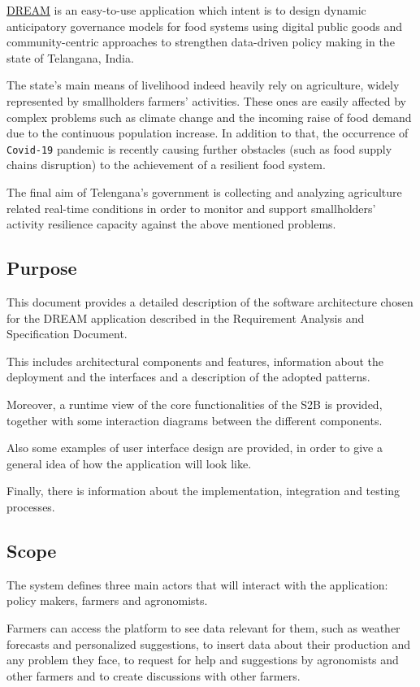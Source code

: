 \hyperref[tab:acronymsTable]{DREAM} is an easy-to-use application which intent is \cite{grw_GitHub} to design dynamic anticipatory governance models for food systems using digital public goods and community-centric approaches to strengthen data-driven policy making in the state of Telangana, India.

The state's main means of livelihood indeed heavily rely on agriculture, widely represented by smallholders farmers' activities. These ones are easily affected by complex problems such as climate change and the incoming raise of food demand due to the continuous population increase. In addition to that, the occurrence of \texttt{Covid-19} pandemic is recently causing further obstacles (such as food supply chains disruption) to the achievement of a resilient food system.

The final aim of Telengana's government is collecting and analyzing agriculture related real-time conditions in order to monitor and support smallholders' activity resilience capacity against the above mentioned problems.

\subsection{Purpose}
\label{sec:purpose}
This document provides a detailed description of the software architecture chosen for the DREAM application described in the Requirement Analysis and Specification Document. 

This includes architectural components and features, information about the deployment and the interfaces and a description of the adopted patterns. 

Moreover, a runtime view of the core functionalities of the S2B is provided, together with some interaction diagrams between the different components. 

Also some examples of user interface design are provided, in order to give a general idea of how the application will look like.

Finally, there is information about the implementation, integration and testing processes.


\subsection{Scope}
\label{sec:scope}
The system defines three main actors that will interact with the application: policy makers, farmers and agronomists.

Farmers can access the platform to see data relevant for them, such as weather forecasts and personalized suggestions, to insert data about their production and any problem they face, to request for help and suggestions by agronomists and other farmers and to create discussions with other farmers.

